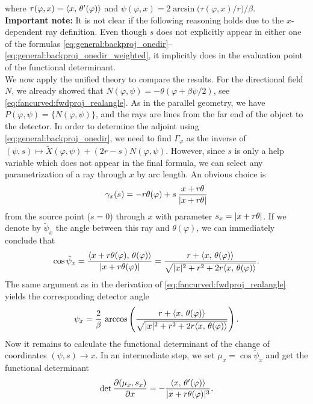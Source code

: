 \documentclass{amsart}
\renewcommand*{\phi}{\varphi}
\begin{document}
%
where $\tau(\phi,x) = \INNER{x}{\theta'(\phi)}$ and $\psi(\phi,x) = 2\arcsin\big(\tau(\phi,x)/r\big) / \beta$.\\[1ex]
%
\textbf{Important note:} It is not clear if the following reasoning holds due to the $x$-dependent ray definition. Even though $s$ does 
not explicitly appear in either one of the formulas \eqref{eq:general:backproj_onedir}--\eqref{eq:general:backproj_onedir_weighted}, it 
implicitly does in the evaluation point of the functional determinant.\\[1ex]
%
We now apply the unified theory to compare the results. For the directional field $N$, we already showed that 
$N(\phi,\psi) = -\theta(\phi + \beta\psi/2)$, see \eqref{eq:fancurved:fwdproj_realangle}. As in the parallel geometry, we have 
$P(\phi,\psi) = \lbrace N(\phi,\psi)\rbrace$, and the rays are lines from the far end of the object to the detector. In order to determine 
the adjoint using \eqref{eq:general:backproj_onedir}, we need to find $\Gamma_\phi$ as the inverse of 
$(\psi, s) \mapsto \tilde X(\phi, \psi) + (2r - s) N(\phi,\psi)$. However, since $s$ is only a help variable which does not appear in the 
final formula, we can select any parametrization of a ray through $x$ by arc length. An obvious choice is
%
\begin{equation*}
 \gamma_x(s) = -r \theta(\phi) + s\, \frac{x + r\theta}{\ABS{x + r\theta}}
\end{equation*}
%
from the source point ($s=0$) through $x$ with parameter $s_x=|x + r\theta|$. If we denote by $\tilde\psi_x$ the angle between this 
ray and  $\theta(\phi)$, we can immediately conclude that
%
\begin{equation*}
 \cos \tilde\psi_x = \frac{\INNER{x + r\theta(\phi)}{\theta(\phi)}}{\ABS{x + r\theta(\phi)}} 
 = \frac{r + \INNER{x}{\theta(\phi)}}{\sqrt{\ABS{x}^2 + r^2 + 2r \INNER{x}{\theta(\phi)}}}.
\end{equation*}
%
The same argument as in the derivation of \eqref{eq:fancurved:fwdproj_realangle} yields the corresponding detector angle
%
\begin{equation}
 \label{eq:fancurved:psi_x}
 \psi_x = \frac{2}{\beta}\, \arccos\left( \frac{r + \INNER{x}{\theta(\phi)}}{\sqrt{\ABS{x}^2 + r^2 + 2r \INNER{x}{\theta(\phi)}}} \right).
\end{equation}
%
Now it remains to calculate the functional determinant of the change of coordinates $(\psi, s) \to x$. In an intermediate step, we set 
$\mu_x = \cos \tilde\psi_x$ and get the functional determinant
%
\begin{equation*}
 \DET \frac{\partial(\mu_x, s_x)}{\partial x} = - \frac{\INNER{x}{\theta'(\phi)}}{\ABS{x + r \theta(\phi)}^3}.
\end{equation*}
\end{document}
